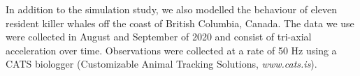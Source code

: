 
In addition to the simulation study, we also modelled the behaviour of eleven resident killer whales off the coast of British Columbia, Canada. The data we use were collected in August and September of 2020 and consist of tri-axial acceleration over time. Observations were collected at a rate of 50 Hz using a CATS biologger (Customizable Animal Tracking Solutions, {\em{www.cats.is}}).


